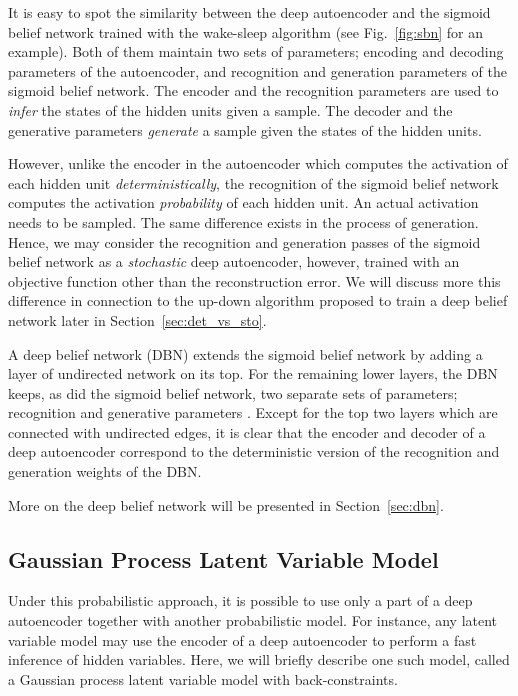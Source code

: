 \documentclass[dissertation,nocontribution,draft*]{aaltoseries}
\begin{document}
It is easy to spot the similarity between the deep
autoencoder and the sigmoid belief network trained with the
wake-sleep algorithm (see Fig.~\ref{fig:sbn} for an
example). Both of them maintain two sets of parameters;
encoding and decoding parameters of the autoencoder, and
recognition and generation parameters of the sigmoid belief
network. The encoder and the recognition parameters are
used to \textit{infer} the states of the hidden units given
a sample. The decoder and the generative parameters
\textit{generate} a sample given the states of the hidden
units.

However, unlike the encoder in the autoencoder which
computes the activation of each hidden unit
\textit{deterministically}, the recognition of the sigmoid
belief network computes the activation \textit{probability}
of each hidden unit. An actual activation needs to be
sampled. The same difference exists in the process of
generation. Hence, we may consider the recognition and
generation passes of the sigmoid belief network as a
\textit{stochastic} deep autoencoder, however, trained with an
objective function other than the reconstruction error.
We will discuss more this difference in connection to
the up-down algorithm proposed to train a deep belief
network \citep{Hinton2006nc} later in
Section~\ref{sec:det_vs_sto}.

A deep belief network (DBN) \citep{Hinton2006nc} extends the
sigmoid belief network by adding a layer of undirected
network on its top. For the remaining lower layers, the DBN
keeps, as did the sigmoid belief network, two separate sets
of parameters; recognition and generative parameters
\citep{Hinton2006nc}.  Except for the top two layers which
are connected with undirected edges, it is clear that the
encoder and decoder of a deep autoencoder correspond to the
deterministic version of the recognition and generation
weights of the DBN.

More on the deep belief network will be presented in
Section~\ref{sec:dbn}.

\subsection{Gaussian Process Latent Variable Model}

Under this probabilistic approach, it is possible to use
only a
part of a deep autoencoder together with another
probabilistic model. For instance, any latent variable model
may use the encoder of a deep autoencoder to perform a fast
inference of hidden variables. Here, we will briefly
describe one such model, called a Gaussian process latent
variable model with back-constraints.
\end{document}
